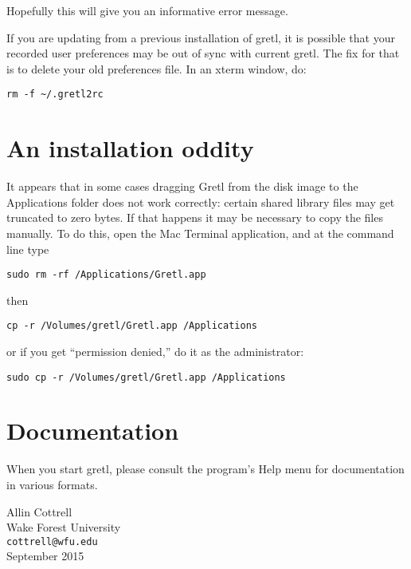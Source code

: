 \documentclass[11pt]{article}
\begin{document}
Hopefully this will give you an informative error message.

If you are updating from a previous installation of gretl, it
is possible that your recorded user preferences may be out of
sync with current gretl.  The fix for that is to delete
your old preferences file.  In an xterm window, do:

\begin{verbatim}
rm -f ~/.gretl2rc
\end{verbatim}

\section{An installation oddity}

It appears that in some cases dragging \textsf{Gretl} from the disk
image to the \textsf{Applications} folder does not work correctly:
certain shared library files may get truncated to zero bytes. If that
happens it may be necessary to copy the files manually. To do this,
open the Mac Terminal application, and at the command line type

\begin{verbatim}
sudo rm -rf /Applications/Gretl.app
\end{verbatim}

then

\begin{verbatim}
cp -r /Volumes/gretl/Gretl.app /Applications
\end{verbatim}

or if you get ``permission denied,'' do it as the administrator:

\begin{verbatim}
sudo cp -r /Volumes/gretl/Gretl.app /Applications
\end{verbatim}

\section{Documentation}
\label{sec:doc}

When you start gretl, please consult the program's Help menu for
documentation in various formats.

\vspace{.25in}

\raggedright
Allin Cottrell \\
Wake Forest University \\
\texttt{cottrell@wfu.edu} \\
September 2015
\end{document}
